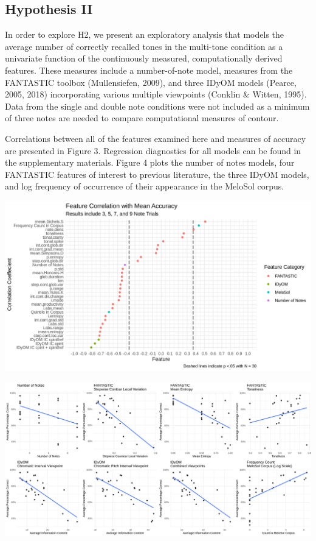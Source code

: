 \documentclass[english,man,floatsintext]{apa6}
\begin{document}
\hypertarget{hypothesis-ii}{%
\subsection{Hypothesis II}\label{hypothesis-ii}}

In order to explore H2, we present an exploratory analysis that models the average number of correctly recalled tones in the multi-tone condition as a univariate function of the continuously measured, computationally derived features.
These measures include a number-of-note model, measures from the FANTASTIC toolbox (Mullensiefen, 2009), and three IDyOM models (Pearce, 2005, 2018) incorporating various multiple viewpoints (Conklin \& Witten, 1995).
Data from the single and double note conditions were not included as a minimum of three notes are needed to compare computational measures of contour.

Correlations between all of the features examined here and measures of accuracy are presented in Figure 3.
Regression diagnostics for all models can be found in the supplementary materials.
Figure 4 plots the number of notes models, four FANTASTIC features of interest to previous literature, the three IDyOM models, and log frequency of occurrence of their appearance in the MeloSol corpus.

\includegraphics{../figures/cor_plot_fig_h2.png}

\includegraphics{../figures/cowplot.png}
\end{document}
